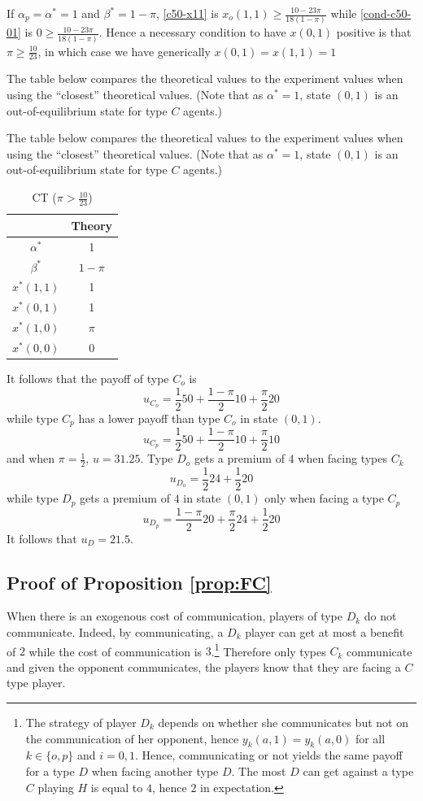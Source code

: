\documentclass[12pt]{article}
\theoremstyle{break}
\begin{document}
If $\alpha_p=\alpha^*=1$ and $\beta^*=1-\pi$, \eqref{c50-x11} is $x_o(1,1)\geq \frac{10-23\pi}{18(1-\pi)}$ while \eqref{cond-c50-01} is $0\geq \frac{10-23\pi}{18(1-\pi)}$. Hence a necessary condition to have $x(0,1)$ positive is that $\pi\geq \frac{10}{23}$, in which case we have generically $x(0,1)=x(1,1)=1$

The table below compares the theoretical values to the experiment values when using the ``closest'' theoretical values. (Note that as $\alpha^*=1$, state $(0,1)$ is an out-of-equilibrium state for type $C$ agents.)

The table below compares the theoretical values to the experiment values when using the ``closest'' theoretical values. (Note that as $\alpha^*=1$, state $(0,1)$ is an out-of-equilibrium state for type $C$ agents.)
%
\begin{table}[h!]
		\centering
		\begin{tabular}{c c}
		& Theory 	 \\
		\hline
		$\alpha^*$ 	& 1	\\
		$\beta^*$ 	& $1-\pi$ \\ 
		\hline
		$x^*(1,1)$ 	& 1	\\ 
		$x^*(0,1)$ & 1 \\ 
		$x^*(1,0)$ & $\pi$ \\
		$x^*(0,0)$ & 0 \\
			\hline
\end{tabular}
\caption{CT ($\pi>\frac{10}{23}$)}
\label{fig:C50}
\end{table}
%
It follows that the payoff of type $C_o$ is
%
\[
u_{C_o}=\frac{1}{2}50+\frac{1-\pi}{2}10+\frac{\pi}{2}20
\]
while type $C_p$ has a lower payoff than type $C_o$ in state $(0,1)$.
%
\[
	u_{C_p}=\frac{1}{2}50+\frac{1-\pi}{2}10+\frac{\pi}{2}10
\]
and when $\pi=\frac{1}{2}$, $u=31.25$. Type $D_o$ gets a premium of $4$ when facing types $C_k$ 
%
\[
u_{D_o}=\frac{1}{2}24+ \frac{1}{2}20
\]
while type $D_p$ gets a premium of $4$ in state $(0,1)$ only when facing a type $C_p$
\[
u_{D_p}=\frac{1-\pi}{2}20+\frac{\pi}{2}24+\frac{1}{2}20
\]
%
It follows that $u_D=21.5$.
%
%
%   
%    

\subsection*{Proof of Proposition \ref{prop:FC}}
When there is an exogenous cost of communication, players of type $D_k$ do not communicate. Indeed, by communicating, a $D_k$ player can get at most a benefit of $2$ while the cost of communication is $3$.\footnote{%
The strategy of player $D_k$ depends on whether she communicates but not on the communication of her opponent, hence $y_k(a,1)=y_k(a,0)$ for all $k\in\{o,p\}$ and $i=0,1$. Hence, communicating or not yields the same payoff for a type $D$ when facing another type $D$. The most $D$ can get against a type $C$ playing $H$ is equal to $4$, hence $2$ in expectation.
} Therefore only types $C_k$ communicate and given the opponent communicates, the players know that they are facing a $C$ type player. 
\end{document}
